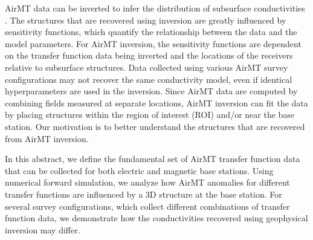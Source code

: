 \documentclass{segabs}
\begin{document}
AirMT data can be inverted to infer the distribution of subsurface conductivities \citep{Holtham2010,Sattel2019}. The structures that are recovered using inversion are greatly influenced by sensitivity functions, which quantify the relationship between the data and the model parameters. For AirMT inversion, the sensitivity functions are dependent on the transfer function data being inverted and the locations of the receivers relative to subsurface structures. Data collected using various AirMT survey configurations may not recover the same conductivity model, even if identical hyperparameters are used in the inversion. Since AirMT data are computed by combining fields measured at separate locations, AirMT inversion can fit the data by placing structures within the region of interest (ROI) and/or near the base station. Our motivation is to better understand the structures that are recovered from AirMT inversion.

In this abstract, we define the fundamental set of AirMT transfer function data that can be collected for both electric and magnetic base stations. Using numerical forward simulation, we analyze how AirMT anomalies for different transfer functions are influenced by a 3D structure at the base station. For several survey configurations, which collect different combinations of transfer function data, we demonstrate how the conductivities recovered using geophysical inversion may differ.
\vspace{-20pt}
\end{document}
